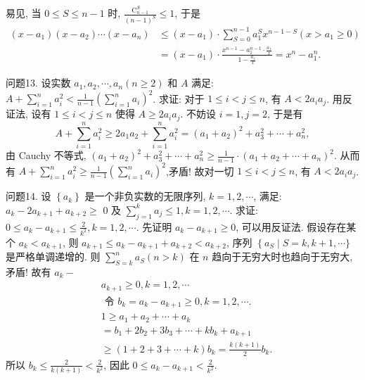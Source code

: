易见, 当 $0 \leqslant S \leqslant n-1$ 时, $\frac{\mathrm{C}_{n-1}^S}{(n-1)^S} \leqslant 1$, 于是
$$
\begin{aligned}
\left(x-a_1\right)\left(x-a_2\right) \cdots\left(x-a_n\right) & \leqslant\left(x-a_1\right) \cdot \sum_{S=0}^{n-1} a_1^S x^{n-1-S}\left(x>a_1 \geqslant 0\right) \\
& =\left(x-a_1\right) \cdot \frac{x^{n-1}-a_1^{n-1} \cdot \frac{a_1}{x}}{1-\frac{a_1}{x}}=x^n-a_1^n .
\end{aligned}
$$



问题13. 设实数 $a_1, a_2, \cdots, a_n(n \geqslant 2)$ 和 $A$ 满足: $A+\sum_{i=1}^n a_i^2<\frac{1}{n-1}\left(\sum_{i=1}^n a_i\right)^2$. 求证: 对于 $1 \leqslant i<j \leqslant n$, 有 $A<2 a_i a_j$.
用反证法, 设有 $1 \leqslant i<j \leqslant n$ 使得 $A \geqslant 2 a_i a_j$.
不妨设 $i=1, j=2$, 于是有
$$
A+\sum_{i=1}^n a_i^2 \geqslant 2 a_1 a_2+\sum_{i=1}^n a_i^2=\left(a_1+a_2\right)^2+a_3^2+\cdots+a_n^2,
$$
由 Cauchy 不等式, $\left(a_1+a_2\right)^2+a_3^2+\cdots+a_n^2 \geqslant \frac{1}{n-1} \cdot\left(a_1+a_2+\cdots+a_n\right)^2$.
从而有 $A+\sum_{i=1}^n a_i^2 \geqslant \frac{1}{n-1}\left(\sum_{i=1}^n a_i\right)^2$,矛盾!
故对一切 $1 \leqslant i<j \leqslant n$, 有 $A<2 a_i a_j$.



问题14. 设 $\left\{a_k\right\}$ 是一个非负实数的无限序列, $k=1,2, \cdots$, 满足: $a_k-2 a_{k+1}+a_{k+2} \geqslant$ 0 及 $\sum_{j=1}^k a_j \leqslant 1, k=1,2, \cdots$. 求证: $0 \leqslant a_k-a_{k+1} \leqslant \frac{2}{k^2}, k=1,2, \cdots$. 
先证明 $a_k-a_{k+1} \geqslant 0$, 可以用反证法.
假设存在某个 $a_k<a_{k+1}$, 则 $a_{k+1} \leqslant a_k-a_{k+1}+a_{k+2}<a_{k+2}$, 序列 $\left\{a_S \mid S=\right. k, k+1, \cdots\}$ 是严格单调递增的.
则 $\sum_{S=k}^n a_S(n>k)$ 在 $n$ 趋向于无穷大时也趋向于无穷大, 矛盾! 故有 $a_k-$
$$
\begin{aligned}
& a_{k+1} \geqslant 0, k=1,2, \cdots \\
& \text { 令 } b_k=a_k-a_{k+1} \geqslant 0, k=1,2, \cdots . \\
& 1 \geqslant a_1+a_2+\cdots+a_k \\
& =b_1+2 b_2+3 b_3+\cdots+k b_k+a_{k+1} \\
& \geqslant(1+2+3+\cdots+k) b_k=\frac{k(k+1)}{2} b_k .
\end{aligned}
$$
所以 $b_k \leqslant \frac{2}{k(k+1)}<\frac{2}{k^2}$, 因此 $0 \leqslant a_k-a_{k+1}<\frac{2}{k^2}$.



